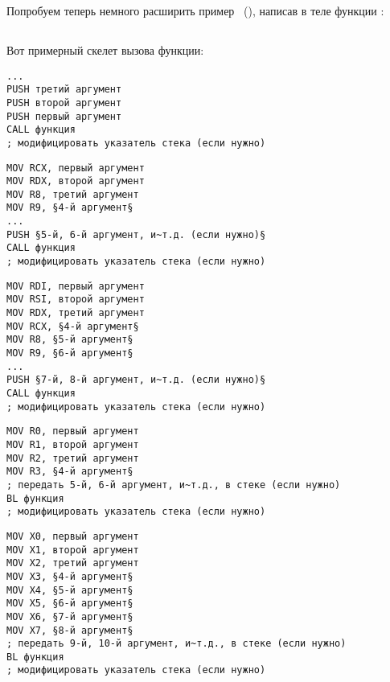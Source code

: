 \mysection{\PrintfSeveralArgumentsSectionName}

Попробуем теперь немного расширить пример \emph{\HelloWorldSectionName}~(),
написав в теле функции \main:







\subsection{\Conclusion{}}

Вот примерный скелет вызова функции:

\begin{lstlisting}[caption=x86,style=customasmx86]
...
PUSH третий аргумент
PUSH второй аргумент
PUSH первый аргумент
CALL функция
; модифицировать указатель стека (если нужно)
\end{lstlisting}

\begin{lstlisting}[caption=x64 (MSVC),style=customasmx86]
MOV RCX, первый аргумент
MOV RDX, второй аргумент
MOV R8, третий аргумент
MOV R9, §4-й аргумент§
...
PUSH §5-й, 6-й аргумент, и~т.д. (если нужно)§
CALL функция
; модифицировать указатель стека (если нужно)
\end{lstlisting}

\begin{lstlisting}[caption=x64 (GCC),style=customasmx86]
MOV RDI, первый аргумент
MOV RSI, второй аргумент
MOV RDX, третий аргумент
MOV RCX, §4-й аргумент§
MOV R8, §5-й аргумент§
MOV R9, §6-й аргумент§
...
PUSH §7-й, 8-й аргумент, и~т.д. (если нужно)§
CALL функция
; модифицировать указатель стека (если нужно)
\end{lstlisting}

\begin{lstlisting}[caption=ARM,style=customasmARM]
MOV R0, первый аргумент
MOV R1, второй аргумент
MOV R2, третий аргумент
MOV R3, §4-й аргумент§
; передать 5-й, 6-й аргумент, и~т.д., в стеке (если нужно)
BL функция
; модифицировать указатель стека (если нужно)
\end{lstlisting}

\begin{lstlisting}[caption=ARM64,style=customasmARM]
MOV X0, первый аргумент
MOV X1, второй аргумент
MOV X2, третий аргумент
MOV X3, §4-й аргумент§
MOV X4, §5-й аргумент§
MOV X5, §6-й аргумент§
MOV X6, §7-й аргумент§
MOV X7, §8-й аргумент§
; передать 9-й, 10-й аргумент, и~т.д., в стеке (если нужно)
BL функция
; модифицировать указатель стека (если нужно)
\end{lstlisting}

